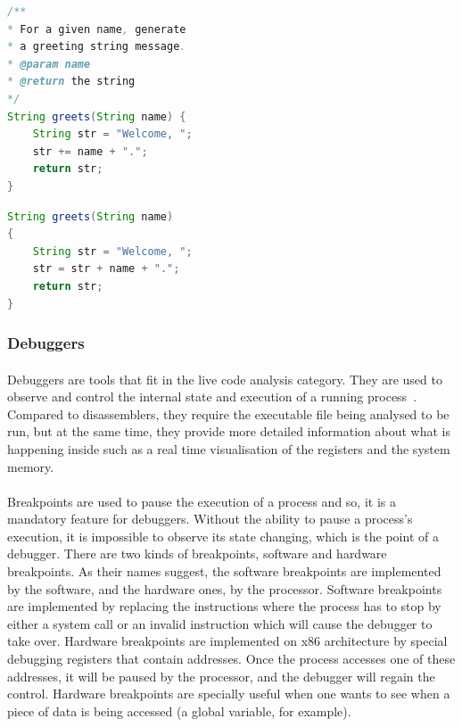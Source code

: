 \noindent\begin{minipage}{.45\textwidth}
	\begin{lstlisting}[caption={Hand written Java program.}, label={lst:java_decompiled_java_1}, frame=tlrb, language=Java]
/**
* For a given name, generate
* a greeting string message.
* @param name
* @return the string
*/
String greets(String name) {
	String str = "Welcome, ";
	str += name + ".";
	return str;     
}
	\end{lstlisting}
\end{minipage}\hfill
\begin{minipage}{.45\textwidth}
	\begin{lstlisting}[caption={Output of the JD-GUI decompiler applied to the partially compiled version of that code found in Listing~\ref{lst:java_decompiled_java_1}.}, label={lst:java_decompiled_java_2}, frame=tlrb, language=Java]
String greets(String name)
{
	String str = "Welcome, ";
	str = str + name + ".";
	return str;
}
	\end{lstlisting}
\end{minipage}

\subsubsection{Debuggers}
\paragraph{}
Debuggers are tools that fit in the live code analysis category. They are used to observe and control the internal state and execution of a running process~\cite{sikorski2012practical}. Compared to disassemblers, they require the executable file being analysed to be run, but at the same time, they provide more detailed information about what is happening inside such as a real time visualisation of the registers and the system memory.

\paragraph{}
Breakpoints are used to pause the execution of a process and so, it is a mandatory feature for debuggers. Without the ability to pause a process's execution, it is impossible to observe its state changing, which is the point of a debugger. There are two kinds of breakpoints, software and hardware breakpoints. As their names suggest, the software breakpoints are implemented by the software, and the hardware ones, by the processor. Software breakpoints are implemented by replacing the instructions where the process has to stop by either a system call or an invalid instruction which will cause the debugger to take over. Hardware breakpoints are implemented on x86 architecture by special debugging registers that contain addresses. Once the process accesses one of these addresses, it will be paused by the processor, and the debugger will regain the control. Hardware breakpoints are specially useful when one wants to see when a piece of data is being accessed (a global variable, for example).

